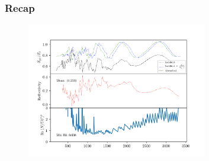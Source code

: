 \documentclass[dvipsnames, 10pt]{beamer}
\begin{document}
\begin{frame}
    \frametitle{Recap}

    \begin{figure}[t]
        \centering
        \includegraphics[width=0.7\textwidth]{f_refl.png}
    \end{figure}
\end{frame}
\end{document}
